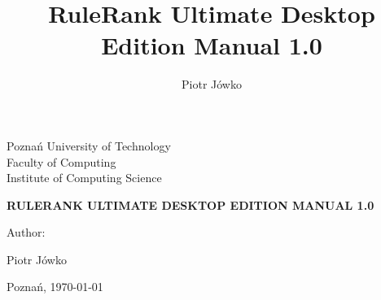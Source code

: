 \documentclass[]{article}
\title{RuleRank Ultimate Desktop Edition Manual 1.0}
\author{Piotr Jówko}
\begin{document}
\vspace*{0.5cm}
\begin{center}
	Pozna\'n University of Technology\\Faculty of Computing\\Institute of Computing Science
\end{center}
\vspace{2cm}
\begin{center}
	\hspace*{-0.4cm}\Large\bfseries\MakeUppercase{RuleRank Ultimate Desktop Edition Manual 1.0}
	\par\vspace{0.1cm}
\end{center}
\vspace*{1.2cm}
\begin{center}
	\begin{Large}
		Author:
	\end{Large}
	\begin{Large}
		Piotr Jówko
	\end{Large}
\end{center}
\vspace{2cm}\begin{center}Poznań, \today\end{center}
\vspace{1.5cm}
\end{document}

